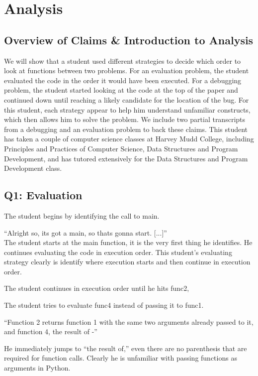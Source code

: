 \section{Analysis}
\subsection{Overview of Claims \& Introduction to Analysis}

We will show that a student used different strategies to decide which order to look at functions between two problems.
For an evaluation problem, the student evaluated the code in the order it would have been executed.
For a debugging problem, the student started looking at the code at the top of the paper and continued down until reaching a likely candidate for the location of the bug.
For this student, each strategy appear to help him understand unfamiliar constructs, which then allows him to solve the problem. 
We include two partial transcripts from a debugging and an evaluation problem to back these claims. 
This student has taken a couple of computer science classes at Harvey Mudd College, including Principles and Practices of Computer Science, Data Structures and Program Development, and has tutored extensively for the Data Structures and Program Development class.

\subsection{Q1: Evaluation}
The student begins by identifying the call to main.

``Alright so, its got a main, so thats gonna start. [...]''\\

The student starts at the main function, it is the very first thing he identifies.
He continues evaluating the code in execution order.
This student's evaluating strategy clearly is identify where execution starts and then continue in execution order.

The student continues in execution order until he hits func2,

The student tries to evaluate func4 instead of passing it to func1.

``Function 2 returns function 1 with the same two arguments already passed to it, and function 4, the result of -''

He immediately jumps to ``the result of,'' even there are no parenthesis that are required for function calls.
Clearly he is unfamiliar with passing functions as arguments in Python.

